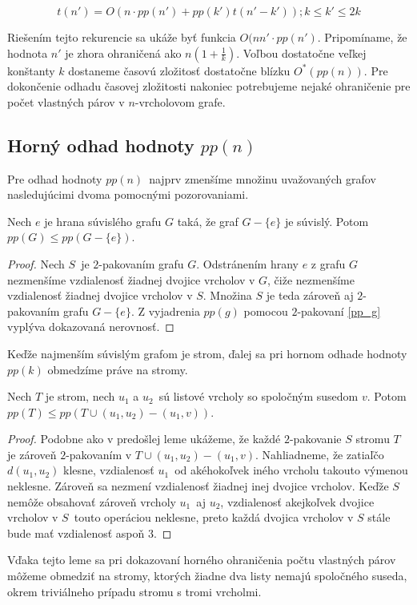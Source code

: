 $$t(n') = O(n \cdot pp(n') + pp(k')t(n' - k')); k \leq k' \leq 2k $$

Riešením tejto rekurencie sa ukáže byť funkcia $O(nn' \cdot pp(n')$. Pripomíname, že hodnota
$n'$ je zhora ohraničená ako $n(1 + \frac{1}{k})$. Voľbou dostatočne veľkej
konštanty $k$ dostaneme časovú zložitosť dostatočne blízku $O^*(pp(n))$. Pre dokončenie
odhadu časovej zložitosti nakoniec potrebujeme nejaké ohraničenie pre počet vlastných
párov v $n$-vrcholovom grafe.

\subsection{Horný odhad hodnoty $pp(n)$}

Pre odhad hodnoty $pp(n)$ najprv zmenšíme množinu uvažovaných grafov nasledujúcimi dvoma
pomocnými pozorovaniami.

\begin{lema}
    Nech $e$ je hrana súvislého grafu $G$ taká, že graf $G-\{e\}$ je súvislý. Potom
    $pp(G) \leq pp(G-\{e\})$.
\end{lema}

\begin{proof}
    Nech $S$ je $2$-pakovaním grafu $G$. Odstránením hrany $e$ z grafu $G$ nezmenšíme
    vzdialenosť žiadnej dvojice vrcholov v $G$, čiže nezmenšíme vzdialenosť žiadnej
    dvojice vrcholov v $S$. Množina $S$ je teda zároveň aj $2$-pakovaním grafu $G-\{e\}$.
    Z vyjadrenia $pp(g)$ pomocou $2$-pakovaní \ref{pp_g} vyplýva dokazovaná nerovnosť.
\end{proof}

Keďže najmenším súvislým grafom je strom, ďalej sa pri hornom odhade hodnoty $pp(k)$ obmedzíme
práve na stromy.

\begin{lema}
   Nech $T$ je strom, nech $u_1$ a $u_2$ sú listové vrcholy so spoločným susedom $v$. Potom
   $pp(T) \leq pp(T \cup (u_1, u_2) - (u_1, v))$.
\end{lema}

\begin{proof}
    Podobne ako v predošlej leme ukážeme, že každé $2$-pakovanie $S$ stromu $T$ je zároveň $2$-pakovaním
    v $T \cup (u_1, u_2) - (u_1, v)$. Nahliadneme, že zatiaľčo $d(u_1, u_2)$ klesne, vzdialenosť
    $u_1$ od akéhokoľvek iného vrcholu takouto výmenou neklesne. Zároveň sa nezmení vzdialenosť
    žiadnej inej dvojice vrcholov. Keďže $S$ nemôže obsahovať zároveň vrcholy $u_1$ aj $u_2$,
    vzdialenosť akejkoľvek dvojice vrcholov v $S$ touto operáciou neklesne, preto každá dvojica
    vrcholov v $S$ stále bude mať vzdialenosť aspoň $3$.
\end{proof}

Vďaka tejto leme sa pri dokazovaní horného ohraničenia počtu vlastných párov môžeme obmedziť
na stromy, ktorých žiadne dva listy nemajú spoločného suseda, okrem triviálneho prípadu
stromu s tromi vrcholmi.



